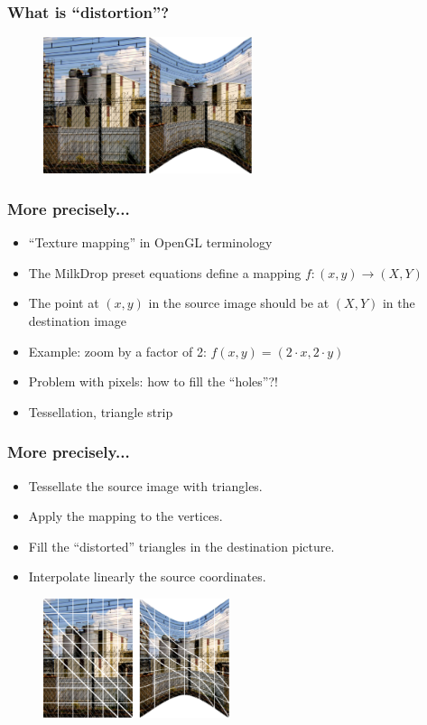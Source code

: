\documentclass{beamer}
\begin{document}
\frame
{
  \frametitle{What is ``distortion''?}
  
  \begin{figure}[H]
  \includegraphics[height=40mm]{distortionsanofi.eps}
  \end{figure}
}

\frame
{
  \frametitle{More precisely...}
  
  \begin{itemize}
  \item ``Texture mapping'' in OpenGL terminology
  \item The MilkDrop preset equations define a mapping $f : (x,y)\rightarrow(X,Y)$
  \item The point at $(x,y)$ in the source image should be at $(X,Y)$ in the destination image
  \item Example: zoom by a factor of 2: $f(x,y) = (2 \cdot x, 2 \cdot y)$
  \item Problem with pixels: how to fill the ``holes''?!
  \item Tessellation, triangle strip
  \end{itemize}
}

\frame
{
  \frametitle{More precisely...}
  \begin{itemize}
  \item Tessellate the source image with triangles.
  \item Apply the mapping to the vertices.
  \item Fill the ``distorted'' triangles in the destination picture.
  \item Interpolate linearly the source coordinates.
  \end{itemize}
  
  \begin{figure}[H]
  \includegraphics[height=35mm]{tesselsanofi.eps}
  \end{figure}
}
\end{document}
